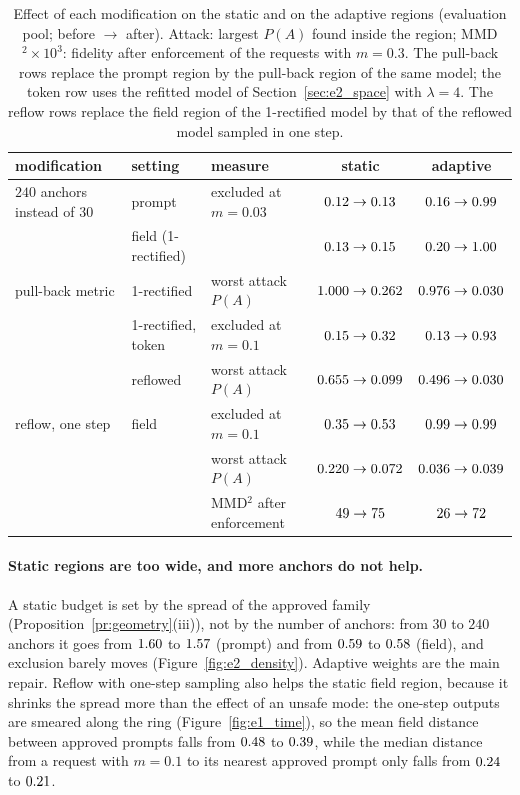 \documentclass{article}
\theoremstyle{plain}
\theoremstyle{remark}
\begin{document}
\begin{table}[!htbp]
\centering
\caption{Effect of each modification on the static and on the adaptive regions (evaluation pool; before $\to$ after). Attack: largest
$P(A)$ found inside the region; MMD$^2\times10^3$: fidelity after enforcement of the requests with $m=0.3$. The pull-back rows replace the
prompt region by the pull-back region of the same model; the token row uses the refitted model of Section~\ref{sec:e2_space} with
$\lambda=4$. The reflow rows replace the field region of the 1-rectified model by that of the reflowed model sampled in one step.}
\label{tab:e2_repairs}
\small
\begin{tabular}{l l l c c}
\toprule
modification & setting & measure & static & adaptive\\
\midrule
$240$ anchors instead of $30$ & prompt & excluded at $m=0.03$ & $0.12\to0.13$ & $0.16\to0.99$\\
& field (1-rectified) & & $0.13\to0.15$ & $0.20\to1.00$\\
\midrule
pull-back metric & 1-rectified & worst attack $P(A)$ & $1.000\to0.262$ & $0.976\to0.030$\\
& 1-rectified, token & excluded at $m=0.1$ & $0.15\to0.32$ & $0.13\to0.93$\\
& reflowed & worst attack $P(A)$ & $0.655\to0.099$ & $0.496\to0.030$\\
\midrule
reflow, one step & field & excluded at $m=0.1$ & $0.35\to0.53$ & $0.99\to0.99$\\
& & worst attack $P(A)$ & $0.220\to0.072$ & $0.036\to0.039$\\
& & MMD$^2$ after enforcement & $49\to75$ & $26\to72$\\
\bottomrule
\end{tabular}
\end{table}

\paragraph{Static regions are too wide, and more anchors do not help.}
A static budget is set by the spread of the approved family (Proposition~\ref{pr:geometry}(iii)), not by the number of anchors: from
$30$ to $240$ anchors it goes from $1.60$ to $1.57$ (prompt) and from $0.59$ to $0.58$ (field), and exclusion barely moves
(Figure~\ref{fig:e2_density}). Adaptive weights are the main repair. Reflow with one-step sampling also helps the static field region,
because it shrinks the spread more than the effect of an unsafe mode: the one-step outputs are smeared along the ring
(Figure~\ref{fig:e1_time}), so the mean field distance between approved prompts falls from $0.48$ to $0.39$, while the median
distance from a request with $m=0.1$ to its nearest approved prompt only falls from $0.24$ to $0.21$.
\end{document}
